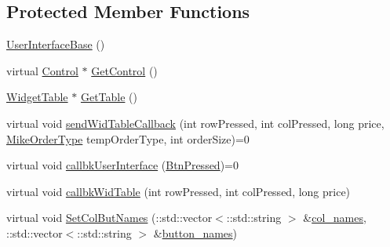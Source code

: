 \subsection*{Protected Member Functions}
\begin{DoxyCompactItemize}
\item 
\hyperlink{class_mike_1_1_user_interface_base_ada6313efe882ae0535f64cf2f3aa1aa2}{User\+Interface\+Base} ()
\item 
virtual \hyperlink{class_mike_1_1_control}{Control} $\ast$ \hyperlink{class_mike_1_1_user_interface_base_ad83087afc74a281927d47a753f752525}{Get\+Control} ()
\item 
\hyperlink{class_mike_1_1_widget_table}{Widget\+Table} $\ast$ \hyperlink{class_mike_1_1_user_interface_base_a0f9e3b0b58927dfc847c07066dd748f9}{Get\+Table} ()
\item 
virtual void \hyperlink{class_mike_1_1_user_interface_base_a42469ffe57a8528064068a84e277ee6a}{send\+Wid\+Table\+Callback} (int row\+Pressed, int col\+Pressed, long price, \hyperlink{namespace_mike_aa486aea8b1d0d07190982a311394e6cb}{Mike\+Order\+Type} temp\+Order\+Type, int order\+Size)=0
\item 
virtual void \hyperlink{class_mike_1_1_user_interface_base_acb35df6eb1e854e714c42f6ae473a193}{callbk\+User\+Interface} (\hyperlink{namespace_mike_a9dd611fa3c671b02e477e6b21465cc66}{Btn\+Pressed})=0
\item 
virtual void \hyperlink{class_mike_1_1_user_interface_base_a56229f8ce8bb05e4b9908fcfc7222412}{callbk\+Wid\+Table} (int row\+Pressed, int col\+Pressed, long price)
\item 
virtual void \hyperlink{class_mike_1_1_user_interface_base_afa6ddc0cce6cf6df28a542bd7e8c3686}{Set\+Col\+But\+Names} (\+::std\+::vector$<$\+::std\+::string $>$ \&\hyperlink{class_mike_1_1_user_interface_base_a9de8526205e04a7d4c2ea9e1486050a8}{col\+\_\+names}, \+::std\+::vector$<$\+::std\+::string $>$ \&\hyperlink{class_mike_1_1_user_interface_base_a541ac5799c899bf3dfad6532d0686bd1}{button\+\_\+names})
\end{DoxyCompactItemize}
